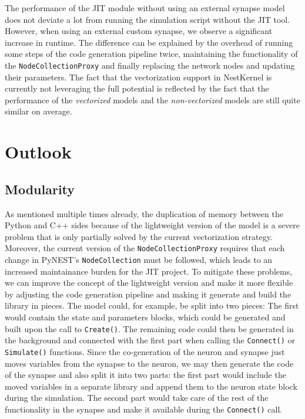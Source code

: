 The performance of the JIT module without using an external synapse model does not deviate a lot from running the simulation script without the JIT tool. However, when using an external custom synapse, we observe a significant increase in runtime. The difference can be explained by the overhead of running some steps of the code generation pipeline twice, maintaining the functionality of the \texttt{NodeCollectionProxy} and finally replacing the network nodes and updating their parameters. The fact that the vectorization support in NestKernel is currently not leveraging the full potential is reflected by the fact that the performance of the \emph{vectorized} models and the \emph{non-vectorized} models are still quite similar on average.

\section{Outlook}

\subsection*{Modularity}

As mentioned multiple times already, the duplication of memory between the Python and C++ sides because of the lightweight version of the model is a severe problem that is only partially solved by the current vectorization strategy. Moreover, the current version of the \texttt{NodeCollectionProxy} requires that each change in PyNEST's \texttt{NodeCollection} must be followed, which leads to an increased maintainance burden for the JIT project. To mitigate these problems, we can improve the concept of the lightweight version and make it more flexible by adjusting the code generation pipeline and making it generate and build the library in pieces. The model could, for example, be split into two pieces: The first would contain the state and parameters blocks, which could be generated and built upon the call to \texttt{Create()}. The remaining code could then be generated in the background and connected with the first part when calling the \texttt{Connect()} or \texttt{Simulate()} functions. Since the co-generation of the neuron and synapse just moves variables from the synapse to the neuron, we may then generate the code of the synapse and also split it into two parts: the first part would include the moved variables in a separate library and append them to the neuron state block during the simulation. The second part would take care of the rest of the functionality in the synapse and make it available during the \texttt{Connect()} call.

